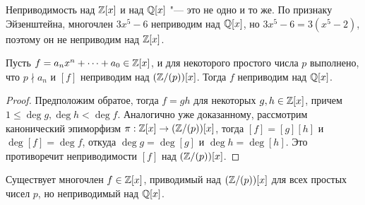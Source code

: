\begin{note}
	Неприводимость над $\mathbb{Z}[x]$ и над $\mathbb{Q}[x]$ "--- это не одно и то же. По признаку Эйзенштейна, многочлен $3x^5 - 6$ неприводим над $\mathbb{Q}[x]$, но $3x^5 - 6 = 3(x^5 - 2)$, поэтому он не неприводим над $\mathbb{Z}[x]$.
\end{note}

\begin{proposition}
	Пусть $f = a_nx^n + \dotsb + a_0 \in \mathbb{Z}[x]$, и для некоторого простого числа $p$ выполнено, что $p \nmid a_n$ и $[f]$ неприводим над $(\mathbb{Z} / (p))[x]$. Тогда $f$ неприводим над $\mathbb{Q}[x]$.
\end{proposition}

\begin{proof}
	Предположим обратое, тогда $f = gh$ для некоторых $g, h \in \mathbb{Z}[x]$, причем $1 \le \deg{g}, \deg{h} < \deg{f}$. Аналогично уже доказанному, рассмотрим канонический эпиморфизм $\pi: \mathbb{Z}[x] \to (\mathbb{Z} / (p))[x]$, тогда $[f] = [g][h]$ и $\deg[f] = \deg{f}$, откуда $\deg{g} = \deg[g]$ и $\deg{h} = \deg[h]$. Это противоречит неприводимости $[f]$ над $(\mathbb{Z} / (p))[x]$.
\end{proof}

\begin{note}
	Существует многочлен $f \in \mathbb{Z}[x]$, приводимый над $(\mathbb{Z} / (p))[x]$ для всех простых чисел $p$, но неприводимый над $\mathbb{Q}[x]$.
\end{note}